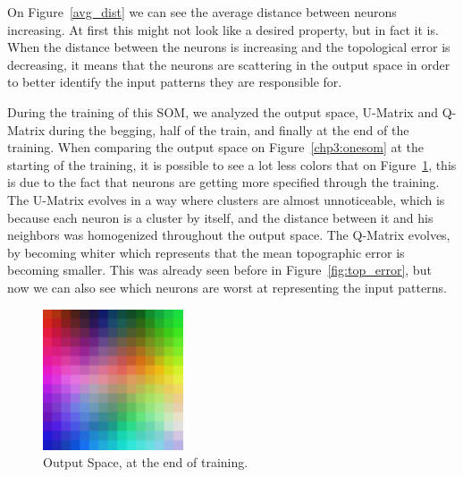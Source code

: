 \documentclass[journal]{IEEEtran}
\begin{document}
On Figure~\ref{avg_dist} we can see the average distance between neurons increasing. At first this might not look like a desired property, but in fact it is. When the distance between the neurons is increasing and the topological error is decreasing, it means that the neurons are scattering in the output space in order to better identify the input patterns they are responsible for.

During the training of this \ac{SOM}, we analyzed the output space, \ac{U-Matrix} and \ac{Q-Matrix} during the begging, half of the train, and finally at the end of the training.
When comparing the output space on Figure~\ref{chp3:onesom} at the starting of the training, it is possible to see a lot less colors that on Figure~\ref{chp3:threesom}, this is due to the fact that neurons are getting more specified through the training. 
The \ac{U-Matrix} evolves in a way where clusters are almost unnoticeable, which is because each neuron is a cluster by itself, and the distance between it and his neighbors was homogenized throughout the output space. 
The \ac{Q-Matrix} evolves, by becoming whiter which represents that the mean topographic error is becoming smaller. This was already seen before in Figure~\ref{fig:top_error}, but now we can also see which neurons are worst at representing the input patterns.  

\begin{figure}[h!]
  \centering
  \includegraphics[width=0.4\linewidth]{./images/som_training/3_som.pdf}
  \caption{Output Space, at the end of training.}
  \label{chp3:threesom}
\end{figure}
\end{document}
